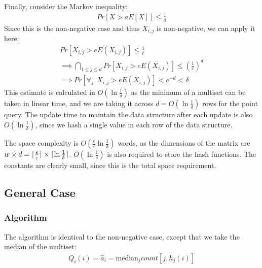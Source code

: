 \documentclass[11pt]{article}
\newcommand{\comment}[1]{}
\newcommand{\sq}{\mathit{Q}_i}
\DeclarePairedDelimiter\ceil{\lceil}{\rceil}
\begin{document}
\pagebreak
Finally, consider the Markov inequality:
\begin{align}
    Pr[X > aE[X]] \leq \frac{1}{a}
\end{align}
Since this is the non-negative case and thus $X_{i, j}$ is non-negative, we can apply it here:
\begin{align}
    Pr[X_{i, j} > e E(X_{i, j})] \leq \frac{1}{e} \\
    \implies \bigcap_{1 \leq j \leq d} Pr[X_{i, j} > e E(X_{i, j})] \leq \left(\frac{1}{e}\right)^d \\
    \implies Pr[\forall_{j \cdot} X_{i, j} > e E(X_{i, j})] \comment{\leq \frac{E(X_{i, j})}{a_i + \varepsilon||a||_1} \leq \frac{\ceil{\frac{\varepsilon}{e}} ||\vec{a}||_1}{a_i + \varepsilon||a||_1}}
      < e^{-d} < \delta
\end{align}
This estimate is calculated in $O(\ln \frac{1}{\delta})$ as the minimum of a
multiset can be taken in linear time, and we are taking it across $d = O(\ln
\frac{1}{\delta})$ rows for the point query.  The update time to maintain the
data structure after each update is also $O(\ln \frac{1}{\delta})$, since we
hash a single value in each row of the data structure.

The space complexity is $O\left({\frac{e}{\varepsilon}}{\ln
\frac{1}{\delta}}\right)$ words, as the dimensions of the matrix are $w \times d =
\ceil{\frac{e}{\varepsilon}}\times\ceil{\ln \frac{1}{\delta}}$.  $O(\ln
\frac{1}{\delta})$ is also required to store the hash functions.  The constants
are clearly small, since this is the total space requirement.

\comment{All previous analyses of sketch algorithm use Chebyshev in their estimation analysis, yielding a dependency on
$\frac{1}{\varepsilon^2}$ for the space complexity.  Using Markov in this analysis yields a tighter bound,
with a dependency $\frac{1}{\varepsilon}$.}

\subsection{General Case}
\subsubsection{Algorithm}
The algorithm is identical to the non-negative case, except that we take the median of the multiset:
\begin{align}
    \sq(i) = \hat{a}_i = \text{median}_j count[j, h_j(i)]
\end{align}
\end{document}
